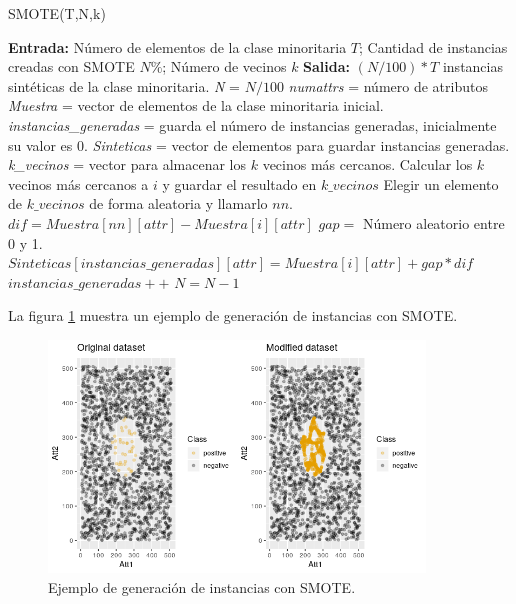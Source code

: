 \begin{algorithm}[H]
	\caption{SMOTE(T,N,k)}
	\label{algo:smote}
	\begin{algorithmic}[0]
		\State \textbf{Entrada:} Número de elementos de la clase minoritaria $T$; Cantidad de instancias creadas con SMOTE $N\%$; Número de vecinos $k$
		\State \textbf{Salida:} $(N/100) * T$ instancias sintéticas de la clase minoritaria.
		\State \textit{N} = $N/100$
		\State \textit{numattrs} = número de atributos
		\State \textit{Muestra} = vector de elementos de la clase minoritaria inicial.
		\State \textit{instancias\_generadas} = guarda el número de instancias generadas, inicialmente su valor es 0.
		\State \textit{Sinteticas} = vector de elementos para guardar instancias generadas.
		\State \textit{k\_vecinos} = vector para almacenar los $k$ vecinos más cercanos.
			\State Calcular los $k$ vecinos más cercanos a $i$ y guardar el resultado en $k\_vecinos$
				\State Elegir un elemento de $k\_vecinos$ de forma aleatoria y llamarlo $nn$.
					\State $dif = Muestra[nn][attr] - Muestra[i][attr]$
					\State $gap =$ Número aleatorio entre 0 y 1.
					\State $Sinteticas[instancias\_generadas][attr] = Muestra[i][attr] + gap*dif$
				\EndFor
				\State $instancias\_generadas ++$
				\State $N = N-1$
			\EndWhile
		\EndFor
	\end{algorithmic}
\end{algorithm}

La figura \ref{fig:41} muestra un ejemplo de generación de instancias con SMOTE.\newline

\begin{figure}[H]
	\centering
	\includegraphics[width=100mm]{imagenes/SMOTE_comparison.png}
	\caption{Ejemplo de generación de instancias con SMOTE.}
	\label{fig:41}
\end{figure}
\verticalspace

